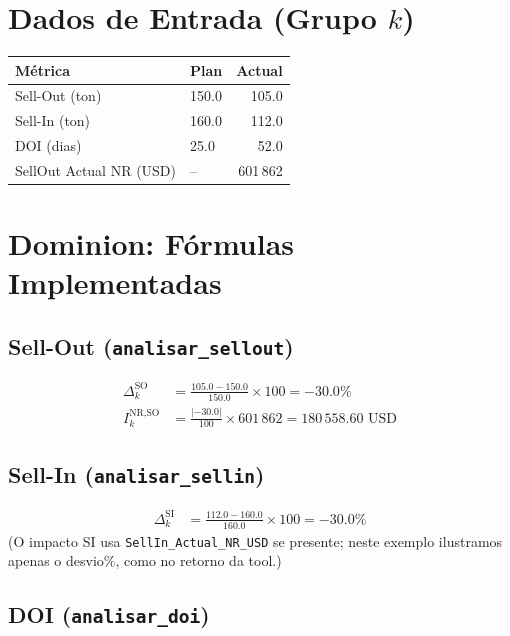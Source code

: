 \documentclass[a4paper, 12pt]{report}
\theoremstyle{definition}
\theoremstyle{remark}
\begin{document}
\section{Dados de Entrada (Grupo $k$)}

\begin{center}
\begin{tabular}{llr}
  \toprule
  \textbf{M\'etrica} & \textbf{Plan} & \textbf{Actual} \\
  \midrule
  Sell-Out (ton) & 150.0 & 105.0 \\
  Sell-In (ton) & 160.0 & 112.0 \\
  DOI (dias) & 25.0 & 52.0 \\
  SellOut Actual NR (USD) & -- & 601\,862 \\
  \bottomrule
\end{tabular}
\end{center}


\section{Dominion: F\'ormulas Implementadas}

\subsection{Sell-Out (\texttt{analisar\_sellout})}

\begin{align*}
  \Delta^{\text{SO}}_k
    &= \frac{105.0 - 150.0}{150.0} \times 100
     = -30.0\% \\
  I^{\text{NR,SO}}_k
    &= \frac{|-30.0|}{100} \times 601\,862
     = 180\,558.60 \text{ USD}
\end{align*}

\subsection{Sell-In (\texttt{analisar\_sellin})}

\begin{align*}
  \Delta^{\text{SI}}_k
    &= \frac{112.0 - 160.0}{160.0} \times 100
     = -30.0\%
\end{align*}
(O impacto SI usa \texttt{SellIn\_Actual\_NR\_USD} se presente; neste
exemplo ilustramos apenas o desvio\%, como no retorno da tool.)

\subsection{DOI (\texttt{analisar\_doi})}
\end{document}
